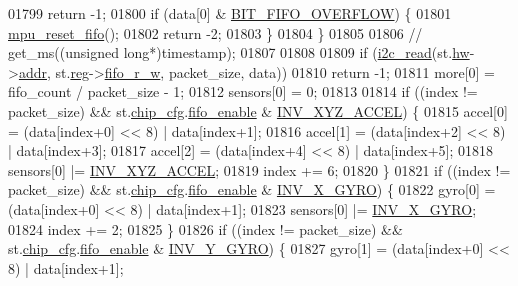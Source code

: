 \begin{DoxyCode}
{{{{{{01799             \textcolor{keywordflow}{return} -1;
01800         \textcolor{keywordflow}{if} (data[0] & \hyperlink{inv__mpu_8c_afb9b49ce5dd973b3c29ae72680924fa7}{BIT\_FIFO\_OVERFLOW}) \{
01801             \hyperlink{group___d_r_i_v_e_r_s_gaf23e9f57c0059be6ec57862f0584de10}{mpu\_reset\_fifo}();
01802             \textcolor{keywordflow}{return} -2;
01803         \}
01804     \}
01805 
01806  \textcolor{comment}{//   get\_ms((unsigned long*)timestamp);}
01807 
01808 
01809     \textcolor{keywordflow}{if} (\hyperlink{_i2_c_8c_ac2d47e7a6c76f93f9b537c31a2986e7b}{i2c\_read}(st.\hyperlink{structgyro__state__s_a5bac30a96752691e4cc723735060e360}{hw}->\hyperlink{structhw__s_a4c34a946600e9d68b6355d23f54d291b}{addr}, st.\hyperlink{structgyro__state__s_ae857e1285c583b7438a208edd691a38e}{reg}->\hyperlink{structgyro__reg__s_a698342c34cc426e84e3435c6b46da120}{fifo\_r\_w}, packet\_size, data))
01810         \textcolor{keywordflow}{return} -1;
01811     more[0] = fifo\_count / packet\_size - 1;
01812     sensors[0] = 0;
01813 
01814     \textcolor{keywordflow}{if} ((index != packet\_size) && st.\hyperlink{structgyro__state__s_ac895217592e2084bd520b0be8e9d20ee}{chip\_cfg}.\hyperlink{structchip__cfg__s_a1f258910658cfcf4bed56c0de8637441}{fifo\_enable} & 
      \hyperlink{group___d_r_i_v_e_r_s_gaa03f025a17ed491e70b88274e89c75c5}{INV\_XYZ\_ACCEL}) \{
01815         accel[0] = (data[index+0] << 8) | data[index+1];
01816         accel[1] = (data[index+2] << 8) | data[index+3];
01817         accel[2] = (data[index+4] << 8) | data[index+5];
01818         sensors[0] |= \hyperlink{group___d_r_i_v_e_r_s_gaa03f025a17ed491e70b88274e89c75c5}{INV\_XYZ\_ACCEL};
01819         index += 6;
01820     \}
01821     \textcolor{keywordflow}{if} ((index != packet\_size) && st.\hyperlink{structgyro__state__s_ac895217592e2084bd520b0be8e9d20ee}{chip\_cfg}.\hyperlink{structchip__cfg__s_a1f258910658cfcf4bed56c0de8637441}{fifo\_enable} & 
      \hyperlink{group___d_r_i_v_e_r_s_gabf02bf28541421d59f8be764f2b95407}{INV\_X\_GYRO}) \{
01822         gyro[0] = (data[index+0] << 8) | data[index+1];
01823         sensors[0] |= \hyperlink{group___d_r_i_v_e_r_s_gabf02bf28541421d59f8be764f2b95407}{INV\_X\_GYRO};
01824         index += 2;
01825     \}
01826     \textcolor{keywordflow}{if} ((index != packet\_size) && st.\hyperlink{structgyro__state__s_ac895217592e2084bd520b0be8e9d20ee}{chip\_cfg}.\hyperlink{structchip__cfg__s_a1f258910658cfcf4bed56c0de8637441}{fifo\_enable} & 
      \hyperlink{group___d_r_i_v_e_r_s_gacdd8ff833a34dba08ca2aa145eb92b44}{INV\_Y\_GYRO}) \{
01827         gyro[1] = (data[index+0] << 8) | data[index+1];
}}}}}}
\end{DoxyCode}
